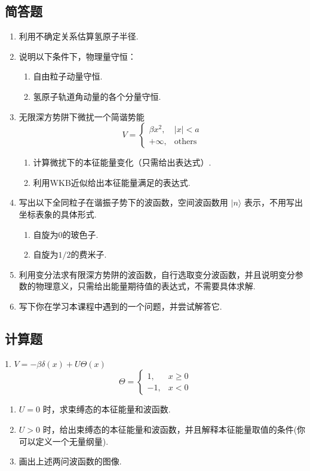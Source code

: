 \subsection*{简答题}

\begin{enumerate}
    \item 利用不确定关系估算氢原子半径.
    \item 说明以下条件下，物理量守恒：
    \begin{enumerate}
        \item[A.] 自由粒子动量守恒.
        \item[B.] 氢原子轨道角动量的各个分量守恒.
    \end{enumerate}
    \item 无限深方势阱下微扰一个简谐势能
    \begin{equation*}
    V = \begin{cases}
    \beta x^2, & |x| < a \\
    +\infty, & \text{others}
    \end{cases}
    \end{equation*}
    \begin{enumerate}
        \item[A.] 计算微扰下的本征能量变化（只需给出表达式）.
        \item[B.] 利用WKB近似给出本征能量满足的表达式.
    \end{enumerate}
    \item 写出以下全同粒子在谐振子势下的波函数，空间波函数用 $|n\rangle$ 表示，不用写出坐标表象的具体形式.
    \begin{enumerate}
        \item 自旋为$0$的玻色子.
        \item 自旋为$1/2$的费米子.
    \end{enumerate}
    \item 利用变分法求有限深方势阱的波函数，自行选取变分波函数，并且说明变分参数的物理意义，只需给出能量期待值的表达式，不需要具体求解.
    \item 写下你在学习本课程中遇到的一个问题，并尝试解答它.
\end{enumerate}

\subsection*{计算题}

1. $V = -\beta\delta(x) + U\Theta(x)$
\begin{equation*}
\Theta = \begin{cases}
1, & x \geq 0 \\
-1, & x < 0
\end{cases}
\end{equation*}
\begin{enumerate}
    \item[A.] $U = 0$ 时，求束缚态的本征能量和波函数.
    \item[B.] $U > 0$ 时，给出束缚态的本征能量和波函数，并且解释本征能量取值的条件(你可以定义一个无量纲量).
    \item[C.] 画出上述两问波函数的图像.
\end{enumerate}

